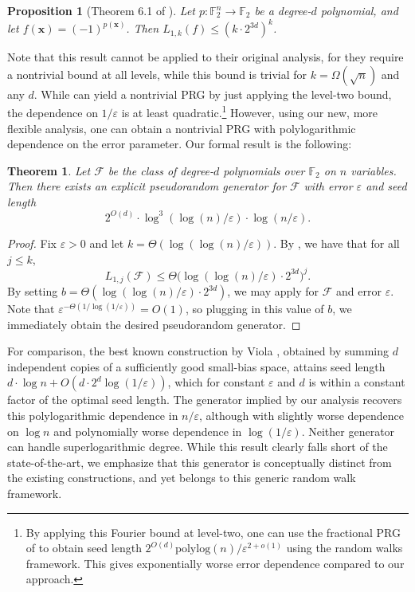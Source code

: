 \documentclass[10pt,a4paper]{article}
\newcommand{\eps}{\varepsilon}
\newtheorem{proposition}[theorem]{Proposition}
\newtheorem{THM}[theorem]{Theorem}
\theoremstyle{definition}
\begin{document}
\begin{proposition}[Theorem 6.1 of \cite{CHHL}]
\label{prop:f2bound}
Let $p\colon\mathbb{F}_2^n\to \mathbb{F}_2$ be a degree-$d$ polynomial, and let $f(\mathbf{x})=(-1)^{p(\mathbf{x})}$. Then $L_{1,k}(f)\leq (k\cdot 2^{3d})^k$.
\end{proposition}
Note that this result cannot be applied to their original analysis, for they require a nontrivial bound at all levels, while this bound is trivial for $k=\Omega(\sqrt{n})$ and any $d$. While   can yield a nontrivial PRG by just applying the level-two bound, the dependence on $1/\eps$ is at least quadratic.\footnote{By applying this Fourier bound at level-two, one can use the fractional PRG of \cite{CHLT} to obtain seed length $2^{O(d)}\mathrm{polylog}(n)/\eps^{2+o(1)}$ using the random walks framework. This gives exponentially worse error dependence compared to our approach.} However, using our new, more flexible analysis, one can obtain a nontrivial PRG with polylogarithmic dependence on the error parameter. Our formal result is the following:

\begin{THM}
Let $\mathcal{F}$ be the class of degree-$d$ polynomials over $\mathbb{F}_2$ on $n$ variables. Then there exists an explicit pseudorandom generator for $\mathcal{F}$ with error $\eps$ and seed length
\begin{equation*}
    2^{O(d)}\cdot \log^3(\log(n)/\eps)\cdot \log(n/\eps).
\end{equation*}
\end{THM}
\begin{proof}
Fix $\eps>0$ and let $k=\Theta(\log(\log(n)/\eps))$. By   , we have that for all $j\leq k$,
\begin{equation*}
    L_{1,j}(\mathcal{F})\leq \Theta\bigl(\log(\log(n)/\eps)\cdot 2^{3d} \bigr)^j.
\end{equation*}
By setting $b=\Theta(\log(\log(n)/\eps)\cdot 2^{3d})$, we may apply    for $\mathcal{F}$ and error $\eps$. Note that $\eps^{-\Theta(1/\log(1/\eps))}=O(1)$, so plugging in this value of $b$, we immediately obtain the desired pseudorandom generator.
\end{proof}
For comparison, the best known construction by Viola \cite{viola2009sum}, obtained by summing $d$ independent copies of a sufficiently good small-bias space, attains seed length $d\cdot \log n + O(d\cdot 2^d \log(1/\eps))$, which for constant $\eps$ and $d$ is within a constant factor of the optimal seed length.  The generator implied by our analysis recovers this polylogarithmic dependence in $n/\eps$, although with slightly worse dependence on $\log n$ and polynomially worse dependence in $\log(1/\eps)$. Neither generator can handle superlogarithmic degree. While this result clearly falls short of the state-of-the-art, we emphasize that this generator is conceptually distinct from the existing constructions, and yet belongs to this generic random walk framework.
\end{document}
